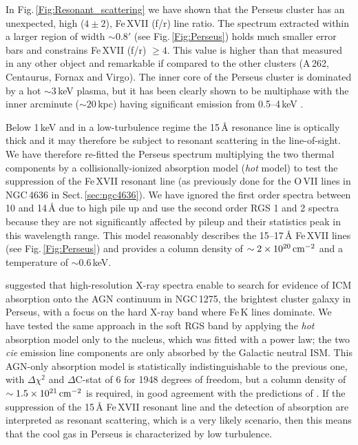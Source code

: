 \documentclass[useAMS,usenatbib]{mn2e}
\begin{document}
{In Fig.\,\ref{Fig:Resonant_scattering} we have shown that the Perseus cluster has an
unexpected, high ($4\pm2$), Fe\,{\small XVII} (f/r) line ratio. 
The spectrum extracted within a larger region of width $\sim0.8'$ 
(see Fig.\,\ref{Fig:Perseus}) holds much smaller error bars 
and constrains Fe\,{\small XVII} (f/r) $\geq4$.
This value is higher than that measured in any other object and 
remarkable if compared to the other clusters 
(A\,262, Centaurus, Fornax and Virgo). 
The inner core of the Perseus cluster is dominated by a hot $\sim3$\,keV plasma, but
it has been clearly shown to be multiphase with the inner arcminute ($\sim20$\,kpc) 
having significant emission from 0.5--4\,keV \citep[see e.g.][]{Sanders2007}.

Below 1\,keV and in a low-turbulence regime the 15\,{\AA} resonance line is optically
thick and it may therefore be subject to resonant scattering in the line-of-sight.
We have therefore re-fitted the Perseus spectrum multiplying the two thermal components
by a collisionally-ionized absorption model (\textit{hot} model) to test the
suppression of the Fe\,{\small XVII} resonant line 
(as previously done for the O\,{\small VII} lines 
in NGC\,4636 in Sect.\,\ref{sec:ngc4636}). 
We have ignored the first order spectra between 10 and 14\,{\AA} due to high pile up 
and use the second order RGS 1 and 2 spectra because they are not 
significantly affected by pileup and their statistics peak in this wavelength range.
This model reasonably describes the 15--17\,{\AA} Fe\,{\small XVII} lines 
(see Fig.\,\ref{Fig:Perseus}) and provides a column density of 
$\sim2\times10^{20}\,{\rm cm}^{-2}$ and a temperature of $\sim0.6$\,keV.

\citet{Fabian2015} suggested that high-resolution X-ray spectra enable to search
for evidence of ICM absorption onto the AGN continuum in NGC\,1275, 
the brightest cluster
galaxy in Perseus, with a focus on the hard X-ray band where Fe\,K lines dominate.
We have tested the same approach in the soft RGS band by applying the \textit{hot}
absorption model only to the nucleus, which was fitted with a power law;
the two \textit{cie} emission line components are only absorbed by the Galactic neutral ISM.
This AGN-only absorption model is statistically indistinguishable to the previous one,
with $\Delta\chi^2$ and $\Delta$C-stat of 6 for 1948 degrees of freedom,
but a column density of $\sim1.5\times10^{21}\,{\rm cm}^{-2}$ is required, 
in good agreement with the predictions of \citet{Fabian2015}. 
{If the suppression of the 15\,{\AA} Fe\,{\small XVII} resonant line 
and the detection of absorption are interpreted as resonant scattering, 
which is a very likely scenario, then this means that the cool gas 
in Perseus is characterized by low turbulence.}

}
\end{document}
